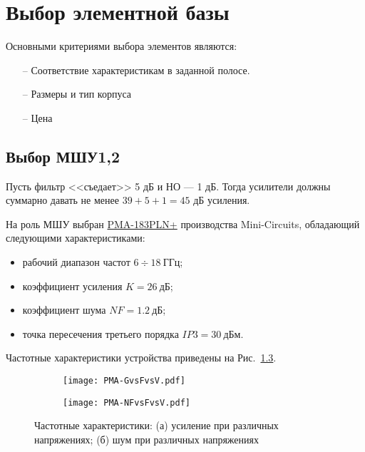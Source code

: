 \chapter{Выбор элементной базы} \label{chap:components-search}

Основными критериями выбора элементов являются:

\begin{itemize}
	\item[--] Соответствие характеристикам в заданной полосе.
	\item[--] Размеры и тип корпуса
	\item[--] Цена
\end{itemize}

\section{Выбор МШУ1,2}

Пусть фильтр <<съедает>> 5 дБ и НО --- 1 дБ. Тогда усилители должны суммарно давать 
не менее $39+5+1=45$ дБ усиления.

На роль МШУ выбран \href{https://www.minicircuits.com/WebStore/dashboard.html?model=PMA-183PLN\%2B}{PMA-183PLN+} производства Mini-Circuits, обладающий следующими характеристиками:
\begin{itemize}
	\item 
	рабочий диапазон частот $6 \div 18~\text{ГГц}$;
	\item
	коэффициент усиления $K = 26~\text{дБ}$;
	\item
	коэффициент шума $NF = 1.2~\text{дБ}$;
	\item
	точка пересечения третьего порядка $IP3 = 30~\text{дБм}$.
\end{itemize}

Частотные характеристики устройства приведены на Рис.~\ref{fig:LNA_responses}.

\begin{figure}[H]
	\centering
	\begin{subfigure}[b]{0.45\textwidth}
		\centering
		\texttt{[image: PMA-GvsFvsV.pdf]}
		\caption{}%
		\label{fig:LNA_gain}
	\end{subfigure}
	\hfill
	\begin{subfigure}[b]{0.45\textwidth}
		\centering
		\texttt{[image: PMA-NFvsFvsV.pdf]}
		\caption{}%
		\label{fig:LNA_NF}
	\end{subfigure}
	\caption{%
		Частотные характеристики:
		(а) усиление при различных напряжениях;
		(б) шум  при различных напряжениях
	}%
	\label{fig:LNA_responses}
\end{figure}


